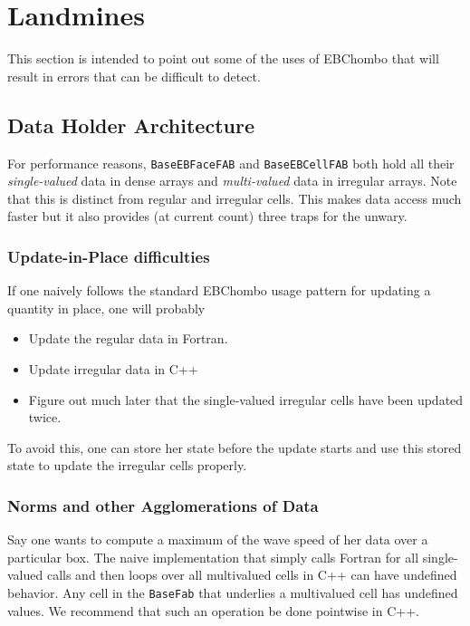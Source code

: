 \section{Landmines}

This section is intended to point out some of the uses of EBChombo 
that will result in errors that can be difficult to detect.

\subsection{Data Holder Architecture}

For performance reasons, {\tt BaseEBFaceFAB} and {\tt BaseEBCellFAB}
both hold all their {\it single-valued} data in dense arrays and {\it
multi-valued} data in irregular arrays.  Note that this is distinct
from regular and irregular cells.  This makes data access much faster
but it also provides (at current count) three traps for the unwary.    

\subsubsection{Update-in-Place difficulties}

If one naively follows the standard EBChombo usage pattern for
updating a quantity in place, one will probably
\begin{itemize}
\item Update the regular data in Fortran.
\item Update irregular data in C++
\item Figure out much later that the single-valued irregular cells
have been updated twice.
\end{itemize}
To avoid this, one can store her state before the update starts and
use this stored state to update the irregular cells properly.

\subsubsection{Norms and other Agglomerations of Data}

Say one wants to compute a maximum of the wave speed of her data over
a particular box.  The naive implementation that simply calls Fortran
for all single-valued calls and then loops over all multivalued cells
in C++ can have undefined behavior.  Any cell in the {\tt BaseFab}
that underlies a multivalued cell has undefined values.  We recommend
that such an operation be done pointwise in C++.


